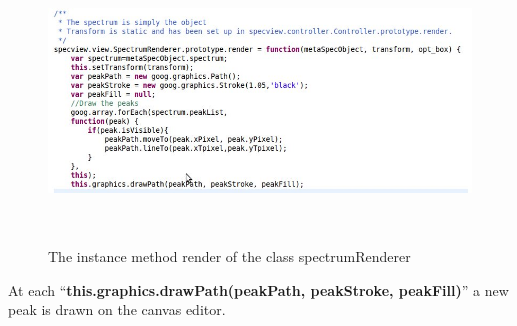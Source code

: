     \begin{figure}[h]
    \begin{centering}
    \caption{The instance method render of the class spectrumRenderer}
\includegraphics[width=190mm,height=75mm]{./images/spectrumRenderer}
    \end{centering}
    \end{figure}

At each ``\textbf{this.graphics.drawPath(peakPath, peakStroke, peakFill)}'' a new peak is drawn on the canvas editor. 
\clearpage
